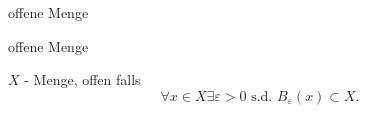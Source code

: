 \documentclass[class=article, crop=false]{standalone}
\begin{document}
\begin{zettel}{offene Menge}
\begin{flashcard}[085f6h79]{offene Menge}
	\begin{definition}[offen]
		$X$ - Menge, offen falls
		\[
			\forall x \in  X \exists \varepsilon > 0 \text{ s.d. } B_\varepsilon(x) \subset X
		.\]
	\end{definition}
\end{flashcard}

\end{zettel}
\end{document}
